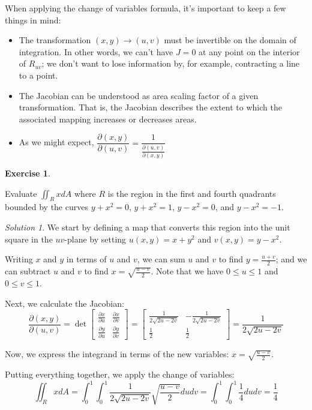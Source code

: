 \documentclass[
]{book}
\providecommand{\tightlist}{%
  \setlength{\itemsep}{0pt}\setlength{\parskip}{0pt}}
\theoremstyle{definition}
\theoremstyle{definition}
\theoremstyle{definition}
\newtheorem{exercise}{Exercise}[chapter]
\theoremstyle{definition}
\theoremstyle{remark}
\newtheorem*{solution}{Solution}
\begin{document}
When applying the change of variables formula, it's important to keep a few things in mind:

\begin{itemize}
\tightlist
\item
  The transformation \((x,y)\to (u,v)\) must be invertible on the domain of integration. In other words, we can't have \(J=0\) at any point on the interior of \(R_{uv}\); we don't want to lose information by, for example, contracting a line to a point.
\item
  The Jacobian can be understood as area scaling factor of a given transformation. That is, the Jacobian describes the extent to which the associated mapping increases or decreases areas.
\item
  As we might expect, \(\dfrac{\partial(x,y)}{\partial(u,v)}=\dfrac{1}{\frac{\partial(u,v)}{\partial(x,y)}}\)
\end{itemize}

\begin{exercise}
\protect\hypertarget{exr:unlabeled-div-100}{}\label{exr:unlabeled-div-100}

Evaluate \(\displaystyle \iint_R x dA\) where \(R\) is the region in the first and fourth quadrants bounded by the curves \(y+x^2=0\), \(y+x^2=1\), \(y-x^2=0\), and \(y-x^2=-1\).

\end{exercise}

\begin{solution}

We start by defining a map that converts this region into the unit square in the \(uv\)-plane by setting \(u(x,y)=x+y^2\) and \(v(x,y)=y-x^2\).

Writing \(x\) and \(y\) in terms of \(u\) and \(v\), we can sum \(u\) and \(v\) to find \(y=\frac{u+v}{2}\); and we can subtract \(u\) and \(v\) to find \(x=\sqrt{\frac{u-v}{2}}\). Note that we have \(0\leq u\leq 1\) and \(0\leq v\leq 1\).

Next, we calculate the Jacobian:
\[\dfrac{\partial(x,y)}{\partial (u,v)}=\det\begin{bmatrix}\frac{\partial x}{\partial u}&\frac{\partial x}{\partial v}\\ \frac{\partial y}{\partial u}& \frac{\partial y}{\partial v}\end{bmatrix} = \begin{bmatrix}\frac{1}{2\sqrt{2u-2v}}& -\frac{1}{2\sqrt{2u-2v}}\\ \frac{1}{2} & \frac{1}{2}\end{bmatrix} = \dfrac{1}{2\sqrt{2u-2v}}\]

Now, we express the integrand in terms of the new variables: \(x=\sqrt{\frac{u-v}{2}}\).

Putting everything together, we apply the change of variables: \[ \iint_R x dA = \int_0^1\int_0^1 \frac{1}{2\sqrt{2u-2v}}\sqrt{\frac{u-v}{2}}du dv = \int_0^1\int_0^1 \frac{1}{4} du dv = \frac{1}{4}\]

\end{solution}
\end{document}
